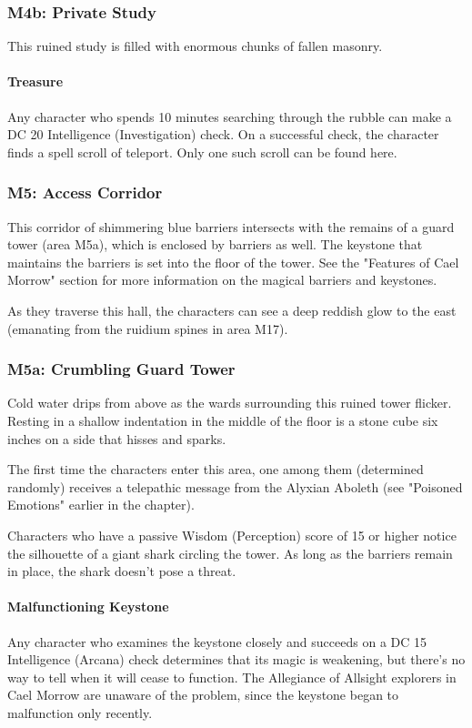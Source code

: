 \documentclass[10pt,a4paper,twoside,bg=print,twocolumn,openany,nodeprecatedcode]{dndbook}
\begin{document}
\subsubsection{M4b: Private Study}
This ruined study is filled with enormous chunks of fallen masonry.

\paragraph{Treasure}
Any character who spends 10 minutes searching through the rubble can make a DC 20 Intelligence (Investigation) check. On a successful check, the character finds a spell scroll of teleport. Only one such scroll can be found here.

\subsubsection{M5: Access Corridor}
This corridor of shimmering blue barriers intersects with the remains of a guard tower (area M5a), which is enclosed by barriers as well. The keystone that maintains the barriers is set into the floor of the tower. See the "Features of Cael Morrow" section for more information on the magical barriers and keystones.

As they traverse this hall, the characters can see a deep reddish glow to the east (emanating from the ruidium spines in area M17).

\subsubsection{M5a: Crumbling Guard Tower}
\begin{DndReadAloud}{}
Cold water drips from above as the wards surrounding this ruined tower flicker. Resting in a shallow indentation in the middle of the floor is a stone cube six inches on a side that hisses and sparks.

\end{DndReadAloud}

The first time the characters enter this area, one among them (determined randomly) receives a telepathic message from the Alyxian Aboleth (see "Poisoned Emotions" earlier in the chapter).

Characters who have a passive Wisdom (Perception) score of 15 or higher notice the silhouette of a giant shark circling the tower. As long as the barriers remain in place, the shark doesn't pose a threat.

\paragraph{Malfunctioning Keystone}
Any character who examines the keystone closely and succeeds on a DC 15 Intelligence (Arcana) check determines that its magic is weakening, but there's no way to tell when it will cease to function. The Allegiance of Allsight explorers in Cael Morrow are unaware of the problem, since the keystone began to malfunction only recently.
\end{document}

